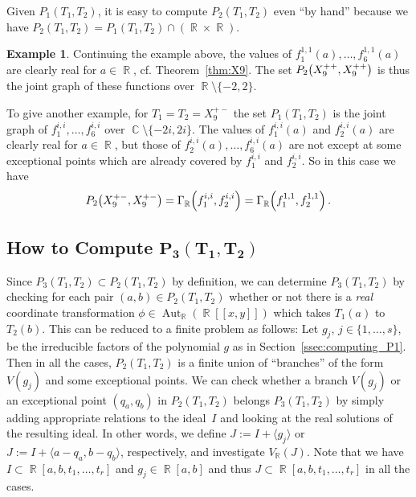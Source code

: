 \documentclass[noend]{amsproc}
\theoremstyle{definition}
\newtheorem{example}[theorem]{Example}
\let\originalleft\left
\let\originalright\right
\renewcommand{\left}{\mathopen{}\mathclose\bgroup\originalleft}
\renewcommand{\right}{\aftergroup\egroup\originalright}
\DeclareMathOperator{\R}{\mathbb{R}}
\DeclareMathOperator{\C}{\mathbb{C}}
\DeclareMathOperator{\Aut}{Aut}
\begin{document}
Given $P_1(T_1, T_2)$, it is easy to compute $P_2(T_1, T_2)$ even ``by hand''
because we have $P_2(T_1, T_2) = P_1(T_1, T_2) \cap (\R \times \R)$.

\begin{example}\label{ex:P2}
Continuing the example above, the values of
$f_1^{1,1}(a), \ldots, f_6^{1,1}(a)$ are clearly real for $a \in \R$, cf.\@
Theorem~\ref{thm:X9}. The set $P_2\left(X_9^{++}, X_9^{++}\right)$ is thus the
joint graph of these functions over $\R \setminus \{-2, 2\}$.

To give another example, for $T_1 = T_2 = X_9^{+-}$ the set $P_1(T_1, T_2)$ is
the joint graph of $f_1^{i,i}, \ldots, f_6^{i,i}$ over
$\C \setminus \{-2i, 2i\}$. The values of $f_1^{i,i}(a)$ and $f_2^{i,i}(a)$ are
clearly real for $a \in \R$, but those of $f_2^{i,i}(a), \ldots, f_6^{i,i}(a)$
are not except at some exceptional points which are already covered by
$f_1^{i,i}$ and $f_2^{i,i}$. So in this case we have
\[
P_2\left(X_9^{+-}, X_9^{+-}\right)
= \Gamma_{\R} \left(f_1^{i,i}, f_2^{i,i}\right)
= \Gamma_{\R} \left(f_1^{1,1}, f_2^{1,1}\right) \,.
\]
\end{example}


\subsection{How to Compute $\boldsymbol{P_3(T_1, T_2)}$}%
\label{ssec:computing_P3}

Since $P_3(T_1, T_2) \subset P_2(T_1, T_2)$ by definition, we can determine
$P_3(T_1, T_2)$ by checking for each pair $(a,b) \in P_2(T_1, T_2)$ whether or
not there is a \emph{real} coordinate transformation
$\phi \in \Aut_{\R}(\R[[x,y]])$ which takes $T_1(a)$ to $T_2(b)$. This can be
reduced to a finite problem as follows: Let $g_j$, $j \in \{1,\ldots,s\}$, be
the irreducible factors of the polynomial $g$ as in
Section~\ref{ssec:computing_P1}. Then in all the cases, $P_2(T_1, T_2)$ is a
finite union of ``branches'' of the form $V(g_j)$ and some exceptional points.
We can check whether a branch $V(g_j)$ or an exceptional point $(q_a, q_b)$ in
$P_2(T_1, T_2)$ belongs $P_3(T_1, T_2)$ by simply adding appropriate relations
to the ideal~$I$ and looking at the real solutions of the resulting ideal. In
other words, we define $J := I+\langle g_j \rangle$ or
$J := I+\langle a-q_a, b-q_b \rangle$, respectively, and investigate
$V_{\R}(J)$. Note that we have $I \subset \R[a,b,t_1,\ldots,t_r]$ and
$g_j \in \R[a,b]$ and thus $J \subset \R[a,b,t_1,\ldots,t_r]$ in all the cases.
\end{document}
